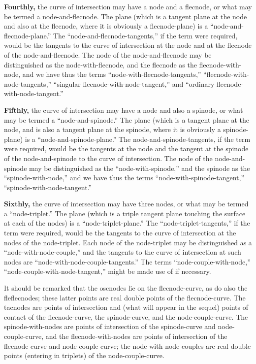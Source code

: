 \documentclass[11pt,a4paper]{book}
\begin{document}
\textbf{Fourthly,} the curve of intersection may have a node and a flecnode, or what may be termed a node-and-flecnode. The plane (which is a tangent plane at the node and also at the flecnode, where it is obviously a flecnode-plane) is a ``node-and-flecnode-plane.'' The ``node-and-flecnode-tangents,'' if the term were required, would be the tangents to the curve of intersection at the node and at the flecnode of the node-and-flecnode. The node of the node-and-flecnode may be distinguished as the node-with-flecnode, and the flecnode as the flecnode-with-node, and we have thus the terms ``node-with-flecnode-tangents,'' ``flecnode-with-node-tangents,'' ``singular flecnode-with-node-tangent,'' and ``ordinary flecnode-with-node-tangent.''

\textbf{Fifthly,} the curve of intersection may have a node and also a spinode, or what may be termed a ``node-and-spinode.'' The plane (which is a tangent plane at the node, and is also a tangent plane at the spinode, where it is obviously a spinode-plane) is a ``node-and-spinode-plane.'' The node-and-spinode-tangents, if the term were required, would be the tangents at the node and the tangent at the spinode of the node-and-spinode to the curve of intersection. The node of the node-and-spinode may be distinguished as the ``node-with-spinode,'' and the spinode as the ``spinode-with-node,'' and we have thus the terms ``node-with-spinode-tangent,'' ``spinode-with-node-tangent.''

\textbf{Sixthly,} the curve of intersection may have three nodes, or what may be termed a ``node-triplet.'' The plane (which is a triple tangent plane touching the surface at each of the nodes) is a ``node-triplet-plane.'' The ``node-triplet-tangents,'' if the term were required, would be the tangents to the curve of intersection at the nodes of the node-triplet. Each node of the node-triplet may be distinguished as a ``node-with-node-couple,'' and the tangents to the curve of intersection at such nodes are ``node-with-node-couple-tangents.'' The terms ``node-couple-with-node,'' ``node-couple-with-node-tangent,'' might be made use of if necessary.

It should be remarked that the oscnodes lie on the flecnode-curve, as do also the fleflecnodes; these latter points are real double points of the flecnode-curve. The tacnodes are points of intersection and (what will appear in the sequel) points of contact of the flecnode-curve, the spinode-curve, and the node-couple-curve. The spinode-with-nodes are points of intersection of the spinode-curve and node-couple-curve, and the flecnode-with-nodes are points of intersection of the flecnode-curve and node-couple-curve; the node-with-node-couples are real double points (entering in triplets) of the node-couple-curve.
\end{document}
